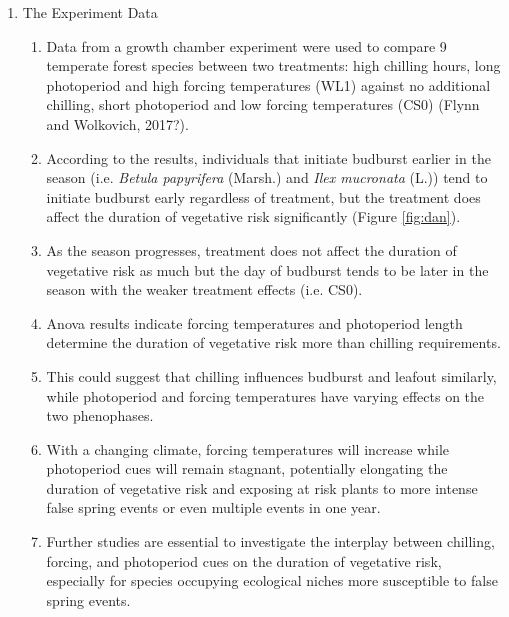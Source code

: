 \documentclass{article}\usepackage[]{graphicx}\usepackage[]{color}
\begin{document}
\begin{enumerate}
\begin{enumerate}
\item The Experiment Data
\begin{enumerate}
\item Data from a growth chamber experiment were used to compare 9 temperate forest species between two treatments: high chilling hours, long photoperiod and high forcing temperatures (WL1) against no additional chilling, short photoperiod and low forcing temperatures (CS0) (Flynn and Wolkovich, 2017?).
\item According to the results, individuals that initiate budburst earlier in the season (i.e. {\textit {Betula papyrifera}} (Marsh.) and {\textit{Ilex mucronata}} (L.)) tend to initiate budburst early regardless of treatment, but the treatment does affect the duration of vegetative risk significantly (Figure \ref{fig:dan}).
\item As the season progresses, treatment does not affect the duration of vegetative risk as much but the day of budburst tends to be later in the season with the weaker treatment effects (i.e. CS0).
\item Anova results indicate forcing temperatures and photoperiod length determine the duration of vegetative risk more than chilling requirements.
\item This could suggest that chilling influences budburst and leafout similarly, while photoperiod and forcing temperatures have varying effects on the two phenophases.
\item With a changing climate, forcing temperatures will increase while photoperiod cues will remain stagnant, potentially elongating the duration of vegetative risk and exposing at risk plants to more intense false spring events or even multiple events in one year. %
\item Further studies are essential to investigate the interplay between chilling, forcing, and photoperiod cues on the duration of vegetative risk, especially for species occupying ecological niches more susceptible to false spring events. 
\end{enumerate}
\end {enumerate}
\end{enumerate}

\end{document}
